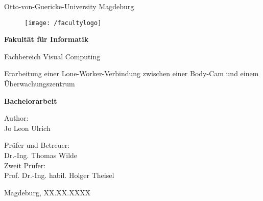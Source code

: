 \documentclass[thesis.tex]{subfiles}
\begin{document}
\thispagestyle {empty}

\begin{center}
\begin{Large}
Otto-von-Guericke-University Magdeburg\\

\begin{figure}
	\centering
	\texttt{[image: /facultylogo]}
	\label{fig:logoinffak}
\end{figure}

\vspace{3mm}

\textbf{Fakultät für Informatik}\\
\end{Large}

\vspace{3mm}

Fachbereich Visual Computing\\

\vspace{1cm}
\begin{Huge}
Erarbeitung einer Lone-Worker-Verbindung zwischen einer Body-Cam und einem Überwachungszentrum\\
\end{Huge}
\vspace{15mm}
{\Huge \textbf{Bachelorarbeit}}\\
\vspace{15mm}

Author:\\
\vspace{4mm}
{\huge Jo Leon Ulrich}\\

\vspace{16mm}

Prüfer und Betreuer:\\
\vspace{2mm}
{\Large Dr.-Ing. Thomas Wilde}\\
\vspace{4mm}
Zweit Prüfer:\\
\vspace{2mm}
{\Large Prof. Dr.-Ing. habil. Holger Theisel}\\
\vspace{10mm}


\vspace{25mm}

{\large Magdeburg, XX.XX.XXXX}\\

\vspace{40mm}

\end{center}
\clearpage
\end{document}
